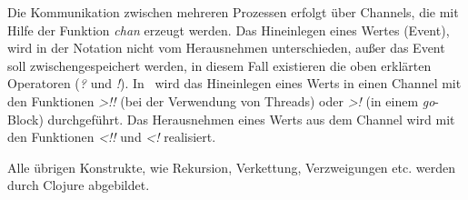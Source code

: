 Die Kommunikation zwischen mehreren Prozessen erfolgt über Channels, die mit Hilfe der Funktion \textit{chan} erzeugt werden. Das Hineinlegen eines Wertes (Event), wird in der Notation nicht vom Herausnehmen unterschieden, außer das Event soll zwischengespeichert werden, in diesem Fall existieren die oben erklärten Operatoren (\textit{?} und \textit{!}). In \CA\ wird das Hineinlegen eines Werts in einen Channel mit den Funktionen \textit{>!!} (bei der Verwendung von Threads) oder \textit{>!} (in einem \textit{go}-Block) durchgeführt. Das Herausnehmen eines Werts aus dem Channel wird mit den Funktionen \textit{<!!} und \textit{<!} realisiert.

Alle übrigen Konstrukte, wie Rekursion, Verkettung, Verzweigungen etc. werden durch Clojure abgebildet.

